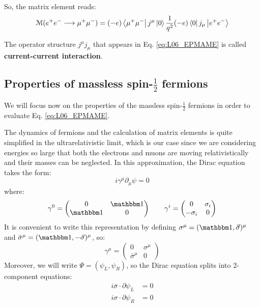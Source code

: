\documentclass[../../main/main.tex]{subfiles}
\begin{document}
So, the matrix element reads:
\begin{equation}
	\mathcal{M}(e^+e^- \longrightarrow \mu^+\mu^-)
	=
	(-e) \bra{\mu^+\mu^-} j^{\mu} \ket{0}
	\frac{1}{q^2}
	(-e) \bra{0} j_{\mu} \ket{e^+e^-}
	\label{eq:L06_EPMAME}
\end{equation}

The operator structure \( j^\mu j_\mu \) that appears in Eq. \ref{eq:L06_EPMAME} is called \textbf{current-current interaction}.



\subsection{Properties of massless spin-\( \frac{1}{2} \) fermions}
We will focus now on the properties of the massless spin-\( \frac{1}{2} \) fermions in order to evaluate Eq. \ref{eq:L06_EPMAME}.

The dynamics of fermions and the calculation of matrix elements is quite simplified in the ultrarelativistic limit, which is our case since we are considering energies so large that both the electrons and muons are moving relativistically and their masses can be neglected. In this approximation, the Dirac equation takes the form:
\begin{equation}
	i \gamma^{\mu} \partial_{\mu} \psi
	=
	0
	\label{eq:L06_DEUL}
\end{equation}
where:
\begin{equation}
	\gamma^0
	=
	\begin{pmatrix}
		0   & \id \\
		\id & 0
	\end{pmatrix}
	\qquad
	\gamma^i
	=
	\begin{pmatrix}
		0   & \sigma_i \\
		-\sigma_i & 0
	\end{pmatrix}
	\label{eq:L06_DM}
\end{equation}
It is convenient to write this representation by defining \( \sigma^\mu = (\id, \va{\sigma})^\mu \) and \( \bar{\sigma}^\mu = (\id, - \va{\sigma})^\mu \), so:
\begin{equation}
	\gamma^\mu
	=
	\begin{pmatrix}
		0   & \sigma^\mu \\
		\bar{\sigma}^\mu   & 0
	\end{pmatrix}
	\label{eq:L06_DMT}
\end{equation}
Moreover, we will write \( \Psi = (\psi_L, \psi_R) \), so the Dirac equation splits into 2-component equations:
\begin{subequations}
	\begin{align}
		i\bar{\sigma} \cdot \partial{\psi_L} &= 0	\\
		i\sigma \cdot \partial{\psi_R} &= 0
	\end{align}
	\label{eq:L06_D2CE}
\end{subequations}
\end{document}
